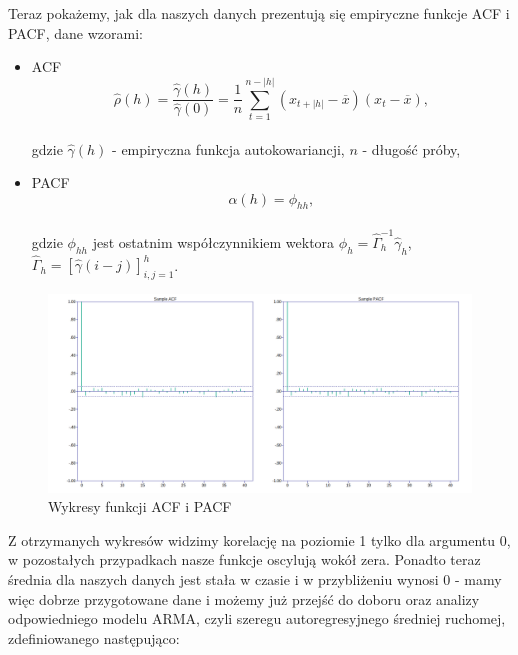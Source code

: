 \documentclass[fleqn]{article}
\theoremstyle{plain}
\begin{document}
    \vskip 0.2in
    Teraz pokażemy, jak dla naszych danych prezentują się empiryczne funkcje ACF i PACF, dane wzorami:\\

    \begin{itemize}
        \item ACF $$\hat{\rho}(h) = \frac{\hat{\gamma}(h)}{\hat{\gamma}(0)} = \frac{1}{n}\sum_{t=1}^{n-|h|}(x_{t+|h|} - \overline{x})(x_{t} - \overline{x}),$$\\ gdzie $\hat{\gamma}(h)$ - empiryczna funkcja autokowariancji, $n$ - długość próby,\\
        \item PACF $$\alpha(h) = \phi_{hh},$$\\ gdzie $\phi_{hh}$ jest ostatnim współczynnikiem wektora $\phi_{h} = \hat{\Gamma}_{h}^{-1}\hat{\gamma}_{h}$, $\hat{\Gamma}_{h} = \left[\hat{\gamma}(i-j)\right]_{i,j=1}^{h}$.
    \end{itemize}

    \newpage

    \begin{figure}[H]
        \centering
        \includegraphics[width=1\textwidth]{acv_pacf.png}
        \caption{Wykresy funkcji ACF i PACF}
        \label{fig:3 ACF_PACF}
    \end{figure}

    \vskip 0.2in 
    Z otrzymanych wykresów widzimy korelację na poziomie 1 tylko dla argumentu 0, w pozostałych przypadkach nasze 
    funkcje oscylują wokół zera. Ponadto teraz średnia dla naszych danych jest stała w czasie i w przybliżeniu wynosi 
    0 - mamy więc dobrze przygotowane dane i możemy już przejść do doboru oraz analizy 
    odpowiedniego modelu ARMA, czyli szeregu autoregresyjnego średniej ruchomej, zdefiniowanego następująco:\\
\end{document}

